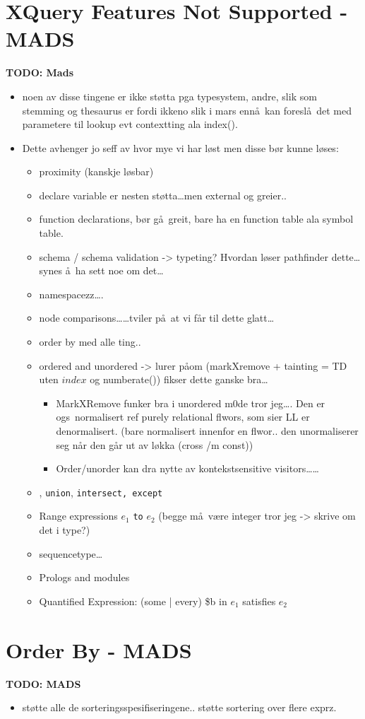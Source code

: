 \section{XQuery Features Not Supported - {MADS}}
\label{sect:disc:notSupported}
\textbf{\LARGE TODO: Mads}
\begin{itemize}
\item noen av disse tingene er ikke st\o tta pga typesystem, andre, slik som stemming og thesaurus er fordi ikkeno
slik i mars enn\aa~kan foresl\aa~det med parametere til lookup evt contextting ala \textsf{index()}.
  \item Dette avhenger jo seff av hvor mye vi har l\o st men disse b\o r kunne
  l\o ses:
  	\begin{itemize}
  		\item proximity (kanskje l\o sbar)
  		\item declare variable er nesten st\o tta\ldots men external og greier..
  		\item function declarations, b\o r g\aa~greit, bare ha en function table ala symbol table.
  		\item schema / schema validation -> typeting? Hvordan l\o ser pathfinder dette\ldots synes \aa~ha sett noe om
  		det\ldots
  		\item namespacezz\ldots.
  		\item node comparisons\ldots\ldots tviler p\aa~at vi f\aa r til dette glatt\ldots
  		\item order by med alle ting..
  		\item ordered and unordered -> lurer p\aa om (markXremove + tainting = TD uten $index$ og
  		\textsf{numberate()}) fikser dette ganske bra\ldots
  		\begin{itemize}
			\item MarkXRemove funker bra i unordered m0de tror jeg\ldots. Den er ogs\a~normalisert ref purely relational
			flwors, som sier LL er denormalisert. (bare normalisert innenfor en flwor.. den unormaliserer seg n\aa r den
			g\aa r ut av l\o kka (cross /m const))
			\item Order/unorder kan dra nytte av kontekstsensitive visitors\ldots\ldots
		\end{itemize}
  		\item \textbar, \texttt{union}, \texttt{intersect, except}
  		\item Range expressions $e_1$ \texttt{to} $e_2$ (begge m\aa~v\ae re integer tror jeg -> skrive om det i type?)
  		\item sequencetype\ldots
  		\item Prologs and modules
  		\item Quantified Expression: (some | every) \$b in $e_1$ satisfies $e_2$
  		\end{itemize}
	\end{itemize}

\section{Order By - {MADS}}
\label{sect:disc:orderby}
\textbf{\LARGE TODO: {MADS}}
\begin{itemize}
  \item st\o tte alle de sorteringsspesifiseringene.. st\o tte sortering over flere exprz.
\end{itemize}
	